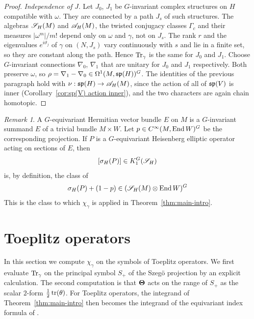 \documentclass[11pt]{amsart}
\theoremstyle{plain}
\theoremstyle{definition}
\theoremstyle{remark}
\newtheorem{remark}[theorem]{Remark}
\begin{document}
\begin{proof}
\emph{Independence of $J$.}
Let $J_0$, $J_1$ be $G$-invariant complex structures on $H$ compatible with $\omega$.
They are connected by a path $J_s$ of such structures.
The algebras ${\mathscr{S}_H}(M)$ and ${\mathscr{A}}_H(M)$, the twisted conjugacy classes $\Gamma_c$ and their measures $|\omega^m|/m!$ depend only on $\omega$ and $\gamma$, not on $J_s$.
The rank $r$ and the eigenvalues $e^{i\vartheta_j}$ of $\gamma$ on $(N,J_s)$ vary continuously with $s$ and lie in a finite set, so they are constant along the path.
Hence $\operatorname{Tr}_\gamma$ is the same for $J_0$ and $J_1$.
Choose $G$-invariant connections $\nabla_0$, $\nabla_1$ that are unitary for $J_0$ and $J_1$ respectively.
Both preserve $\omega$, so $\rho=\nabla_1-\nabla_0\in\Omega^1(M,\mathfrak{sp}(H))^G$.
The identities of the previous paragraph hold with $\nu:\mathfrak{sp}(H)\to{\mathscr{A}}_H(M)$, since the action of all of $\mathfrak{sp}(V)$ is inner (Corollary~\ref{cor:sp(V) action inner}), and the two characters are again chain homotopic.

\end{proof}



\begin{remark}
A $G$-equivariant Hermitian vector bundle $E$ on $M$ is a $G$-invariant summand $E$ of a trivial bundle $M\times W$. Let $p\in C^\infty(M,\operatorname{End} W)^G$ be  the corresponding projection.
If $P$ is a $G$-equivariant Heisenberg elliptic operator acting on sections of $E$, then
\[[\sigma_H(P)]\in K_1^G({\mathscr{S}_H})\]
is, by definition, the class of
\[ \sigma_H(P)+(1-p)\in ({\mathscr{S}_H}(M)\otimes\operatorname{End} W)^G\]
This is the class to which $\chi_\gamma$ is applied in  Theorem~\ref{thm:main-intro}.
    
\end{remark}

\section{Toeplitz operators}\label{sec:Toeplitz operators}

In this section we compute $\chi_\gamma$ on the symbols of Toeplitz operators.
We first evaluate $\operatorname{Tr}_\gamma$ on the principal symbol $S_+$ of the Szeg\"o projection by an explicit calculation.
The second computation is that $\boldsymbol{\Theta}$ acts on the range of $S_+$ as the scalar $2$-form $\frac12\operatorname{tr}(\theta)$.
For Toeplitz operators, the integrand of Theorem~\ref{thm:main-intro} then becomes the integrand of the equivariant index formula of \cite[Theorem~2]{GvE26}.
\end{document}
